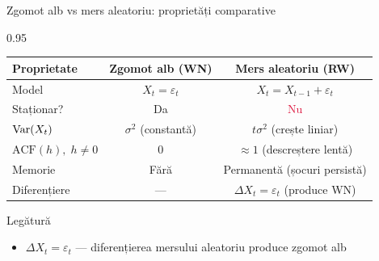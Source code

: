 \documentclass[9pt, aspectratio=169, t]{beamer}
\begin{document}
\begin{frame}{Zgomot alb vs mers aleatoriu: proprietăți comparative}
    \begin{cminipage}{0.95\textwidth}
        \vspace{-0.2cm}
        {\footnotesize
        \begin{center}
        \renewcommand{\arraystretch}{1.25}
        \begin{tabular}{l c c}
            \hline
            \textbf{Proprietate} & \textbf{Zgomot alb (WN)} & \textbf{Mers aleatoriu (RW)} \\
            \hline
            Model & $X_t = \varepsilon_t$ & $X_t = X_{t-1} + \varepsilon_t$ \\
            Staționar? & \textcolor{Forest}{Da} & \textcolor{Crimson}{Nu} \\
            $\text{Var}(X_t)$ & $\sigma^2$ (constantă) & $t\sigma^2$ (crește liniar) \\
            $\mathrm{ACF}(h),\; h \neq 0$ & $0$ & $\approx 1$ (descreștere lentă) \\
            Memorie & Fără & Permanentă (șocuri persistă) \\
            Diferențiere & --- & $\Delta X_t = \varepsilon_t$ (produce WN) \\
            \hline
        \end{tabular}
        \end{center}
        \vspace{0.1cm}
        \begin{block}{Legătură}
            \begin{itemize}\setlength{\itemsep}{0pt}
                \item $\Delta X_t = \varepsilon_t$ --- diferențierea mersului aleatoriu produce zgomot alb
            \end{itemize}
        \end{block}
        }
        \hfill{}
    \end{cminipage}
\end{frame}
\end{document}
